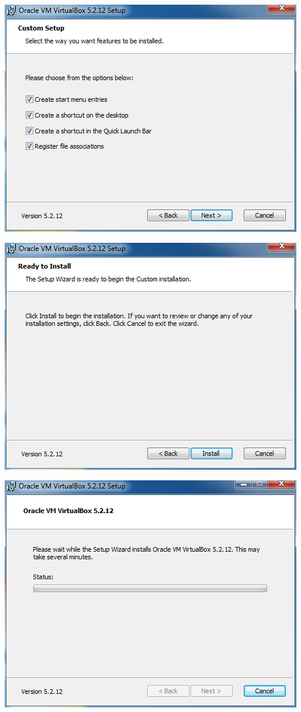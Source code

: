 \begin{center}
		\includegraphics[width=\linewidth]{Anexo01/oracleVirtualBox04.png}

		\includegraphics[width=\linewidth]{Anexo01/oracleVirtualBox05.png}

		\includegraphics[width=\linewidth]{Anexo01/oracleVirtualBox06.png}


\end{center}
